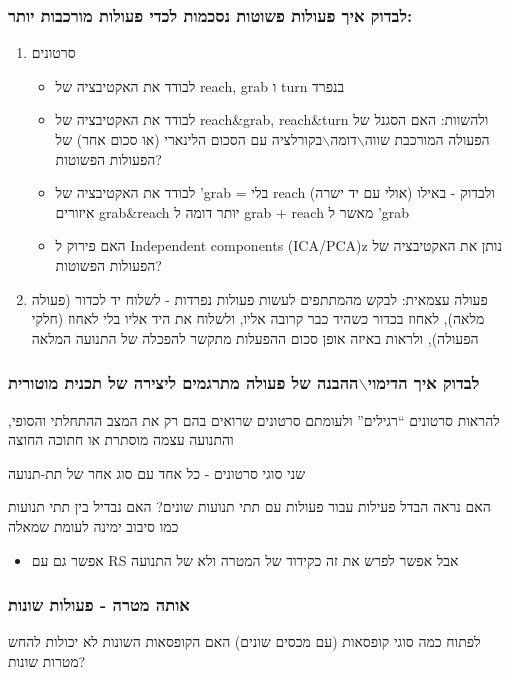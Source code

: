 \documentclass[11pt]{article}
\begin{document}
\subsubsection{לבדוק איך פעולות פשוטות נסכמות לכדי פעולות מורכבות יותר:}
\label{sec:orge77ae8e}
\begin{enumerate}
\item סרטונים
\label{sec:org3ed234f}
\begin{itemize}
\item לבודד את האקטיבציה של reach, grab ו turn בנפרד
\item לבודד את האקטיבציה של reach\&grab, reach\&turn ולהשוות: האם הסגנל של הפעולה המורכבת שווה$\backslash$דומה$\backslash$בקורלציה עם הסכום הלינארי (או סכום אחר) של הפעולות הפשוטות?
\item לבודד את האקטיבציה של 'grab = בלי reach (אולי עם יד ישרה) ולבדוק - באילו איזורים grab\&reach יותר דומה ל grab + reach מאשר ל 'grab
\item האם פירוק ל Independent components (ICA/PCA)z נותן את האקטיבציה של הפעולות הפשוטות?
\end{itemize}
\item פעולה עצמאית:
\label{sec:org7c34c14}
לבקש מהמתתפים לעשות פעולות נפרדות - לשלוח יד לכדור (פעולה מלאה), לאחוז בכדור כשהיד כבר קרובה אליו, ולשלוח את היד אליו בלי לאחוז (חלקי הפעולה), ולראות באיזה אופן סכום ההפעלות מתקשר להפכלה של התנועה המלאה
\end{enumerate}

\subsubsection{לבדוק איך הדימוי$\backslash$ההבנה של פעולה מתרגמים ליצירה של תכנית מוטורית}
\label{sec:orgc3b09d5}
להראות סרטונים ``רגילים'' ולעומתם סרטונים שרואים בהם רק את המצב ההתחלתי והסופי, והתנועה עצמה מוסתרת או חתוכה החוצה

שני סוגי סרטונים - כל אחד עם סוג אחר של תת-תנועה

האם נראה הבדל פעילות עבור פעולות עם תתי תנועות שונים? האם נבדיל בין תתי תנועות כמו סיבוב ימינה לעומת שמאלה
\begin{itemize}
\item אפשר גם עם RS אבל אפשר לפרש את זה כקידוד של המטרה ולא של התנועה
\end{itemize}

\subsubsection{אותה מטרה - פעולות שונות}
\label{sec:org8af0144}
לפתוח כמה סוגי קופסאות (עם מכסים שונים)
האם הקופסאות השונות לא יכולות להחש מטרות שונות?
\end{document}
